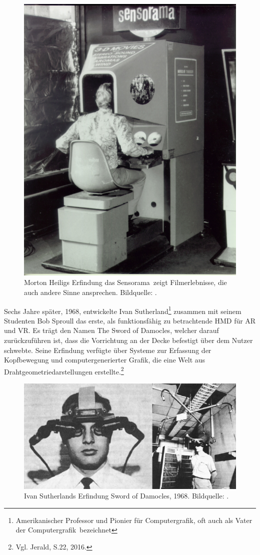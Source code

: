 \begin{figure}[H]
	\centering
	\includegraphics[width=.5\textwidth]{figuren/Sensorama-morton-heilig-virtual-reality-headset}
	\caption{Morton Heiligs Erfindung das \frqq Sensorama\flqq\ zeigt Filmerlebnisse, die auch andere Sinne ansprechen. Bildquelle: \cite{sensorama}.}
	\label{fig:Heilig_Sensorama}
\end{figure}Sechs Jahre später, 1968, entwickelte Ivan Sutherland\footnote{Amerikanischer Professor und Pionier für Computergrafik, oft auch als \glqq Vater der Computergrafik\grqq\ bezeichnet} zusammen mit seinem Studenten Bob Sproull das erste, als funktionsfähig zu betrachtende HMD für AR und VR. Es trägt den Namen \frqq The Sword of Damocles\flqq, welcher darauf zurückzuführen ist, dass die Vorrichtung an der Decke befestigt über dem Nutzer schwebte. Seine Erfindung verfügte über Systeme zur Erfassung der Kopfbewegung und computergenerierter Grafik, die eine Welt aus Drahtgeometriedarstellungen erstellte.\footnote{ Vgl. Jerald, S.22, 2016.}
\begin{figure}[ht]
	\centering
	\includegraphics[width=.5\textwidth]{figuren/Sword_of_damocles}
	\caption{Ivan Sutherlands Erfindung \frqq Sword of Damocles\flqq, 1968. Bildquelle: \cite{swordOfDamocles}.}
	\label{fig:Sutherland_sod}
\end{figure}
